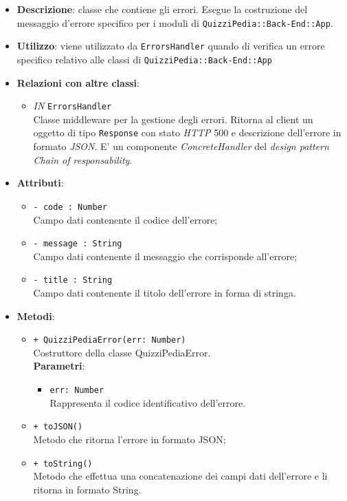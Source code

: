 	\begin{itemize}
		\item \textbf{Descrizione}:
		classe che contiene gli errori. Esegue la costruzione del messaggio d'errore specifico per i moduli di \texttt{QuizziPedia::Back-End::App}.
		\item \textbf{Utilizzo}:
		viene utilizzato da \texttt{ErrorsHandler} quando di verifica un errore specifico relativo alle classi di \texttt{QuizziPedia::Back-End::App}
		\item \textbf{Relazioni con altre classi}:
			 \begin{itemize}
			 	\item \textit{IN} \texttt{ErrorsHandler} \\
			 	Classe middleware per la gestione degli errori. Ritorna al client un oggetto di tipo \texttt{Response} con stato \textit{HTTP} 500 e descrizione dell'errore in formato \textit{JSON}. E' un componente \textit{ConcreteHandler} del \textit{design pattern} \textit{Chain of responsability}.
			 \end{itemize}
		\item \textbf{Attributi}:
			 \begin{itemize}
			 	\item \texttt{- code : Number}\\
			 	Campo dati contenente il codice dell'errore;
			 	\item \texttt{- message : String}\\
			 	Campo dati contenente il messaggio che corrisponde all'errore;
			 	\item \texttt{- title : String}\\
			 	Campo dati contenente il titolo dell'errore in forma di stringa.
			 \end{itemize}
		\item \textbf{Metodi}:
			\begin{itemize}
				\item \texttt{+ QuizziPediaError(err: Number)}\\
				Costruttore della classe QuizziPediaError.\\
				\textbf{Parametri}:
				\begin{itemize}
					\item \texttt{err: Number}\\
					Rappresenta il codice identificativo dell'errore.
				\end{itemize}
				\item \texttt{+ toJSON()}\\
				Metodo che ritorna l'errore in formato JSON;
				\item \texttt{+ toString()}\\
				Metodo che effettua una concatenazione dei campi dati dell'errore e li ritorna in formato String.
			\end{itemize}
	\end{itemize}